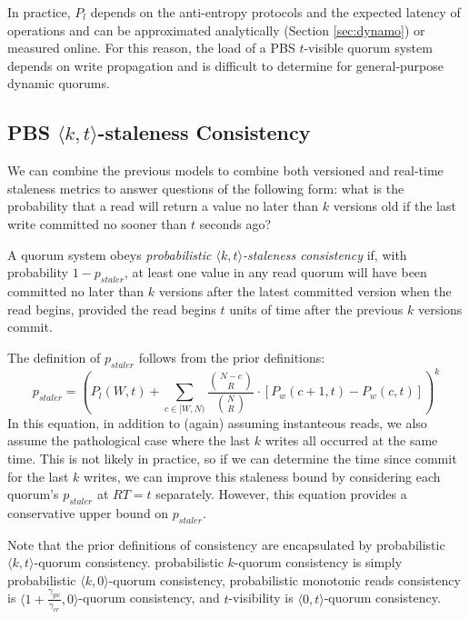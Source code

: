 \documentclass{vldb}
\begin{document}
In practice, $P_l$ depends on the anti-entropy protocols and the
expected latency of operations and can be approximated analytically
(Section \ref{sec:dynamo}) or measured online.  For this reason,
the load of a PBS $t$-visible quorum system depends on write
propagation and is difficult to determine for general-purpose dynamic
quorums.


\subsection{PBS $\langle k, t
  \rangle$-staleness Consistency}

We can combine the previous models to combine both versioned and
real-time staleness metrics to answer questions of the following form:
what is the probability that a read will return a value no later than
$k$ versions old if the last write committed no sooner than $t$ seconds
ago?
\begin{definition}
A quorum system obeys \textit{probabilistic $\langle k, t
  \rangle$-staleness consistency} if, with probability $1-p_{staler}$, at
least one value in any read quorum will have been committed no later
than $k$ versions after the latest committed version when the read
begins, provided the read begins $t$ units of time after the previous
$k$ versions commit.
\end{definition}
The definition of $p_{staler}$ follows from the prior definitions:
\begin{equation}
p_{staler} = (P_l(W, t)+\sum_{c\in[W, N)} \frac{{N-c \choose R}}{{N \choose R}} \cdot [P_w(c+1, t)-P_w(c,t)])^k
\end{equation}
In this equation, in addition to (again) assuming instanteous reads,
we also assume the pathological case where the last $k$ writes all
occurred at the same time.  This is not likely in practice, so if we
can determine the time since commit for the last $k$ writes, we can
improve this staleness bound by considering each quorum's $p_{staler}$
at $RT=t$ separately.  However, this equation provides a conservative
upper bound on $p_{staler}$.

Note that the prior definitions of consistency are encapsulated by
probabilistic $\langle k, t \rangle$-quorum consistency. probabilistic
$k$-quorum consistency is simply probabilistic $\langle k, 0
\rangle$-quorum consistency, probabilistic monotonic reads consistency
is $\langle 1+\frac{\gamma_{gw}}{\gamma_{cr}}, 0 \rangle$-quorum
consistency, and $t$-visibility is $\langle 0, t \rangle$-quorum
consistency.
\end{document}
